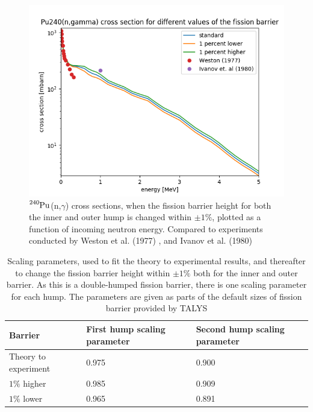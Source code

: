 \documentclass[]{article}
\begin{document}
  \begin{figure} [H]
	\centering
	\includegraphics[scale=0.7]{Gamma_cross_section_varying_fission_barrier.png}
	\caption{ $\ce{^{240}Pu}$(n,$\gamma$) cross sections, when the fission barrier height for both the inner and outer hump is changed within $\pm 1 \%$, plotted as a function of incoming neutron energy. Compared to experiments conducted by Weston et al. (1977) \cite{Weston1977}, and Ivanov et al. (1980) \cite{Ivanov1980}}
	\label{fig:Gamma_cross_section_varying_fission_barrier}
\end{figure}

\begin{table} [H]
	\centering
	\caption{Scaling parameters, used to fit the theory to experimental results, and thereafter to change the fission barrier height within $\pm 1 \%$ both for the inner and outer barrier. As this is a double-humped fission barrier, there is one scaling parameter for each hump. The parameters are given as parts of the default sizes of fission barrier provided by TALYS}
	\begin{tabularx}{\textwidth}{XXX} \hline
		\label{tab:scalingparm_fission_barrier}
		Barrier & First hump scaling parameter & Second hump scaling parameter\\ \hline
		Theory to experiment & 0.975 & 0.900 \\
		$1 \% $ higher & 0.985  & 0.909  \\
		$1 \% $ lower & 0.965 & 0.891 \\ \hline
	\end{tabularx}
\end{table}
\end{document}
